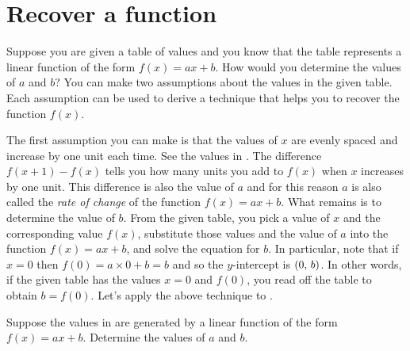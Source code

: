 \documentclass[a4paper,oneside,12pt]{article}
\begin{document}

\section{Recover a function}

Suppose you are given a table of values and you know that the table
represents a linear function of the form $f(x) = ax + b$.  How would
you determine the values of $a$ and $b$?  You can make two assumptions
about the values in the given table.  Each assumption can be used to
derive a technique that helps you to recover the function $f(x)$.

The first assumption you can make is that the values of $x$ are evenly
spaced and increase by one unit each time.  See the values in
.  The difference
$f(x + 1) - f(x)$ tells you how many units you add to $f(x)$ when $x$
increases by one unit.  This difference is also the value of $a$ and
for this reason $a$ is also called the \emph{rate of change} of the
function $f(x) = ax + b$.  What remains is to determine the value of
$b$.  From the given table, you pick a value of $x$ and the
corresponding value $f(x)$, substitute those values and the value of
$a$ into the function $f(x) = ax + b$, and solve the equation for
$b$.  In particular, note that if $x = 0$ then
$f(0) = a \times 0 + b = b$ and so the $y$-intercept is
$\left\lparen{0},\, {b}\right\rparen$.  In other words, if the given table has the values
$x = 0$ and $f(0)$, you read off the table to obtain $b = f(0)$.
Let's apply the above technique to
.

\begin{table}[!htbp]
\centering

\caption{%
  Some values of a linear function $f(x) = ax + b$.
}
\label{tab:function_values_a_2_b_minus_1}
\end{table}

\begin{example}
Suppose the values in  are
generated by a linear function of the form $f(x) = ax + b$.  Determine
the values of $a$ and $b$.
\end{example}
\end{document}
